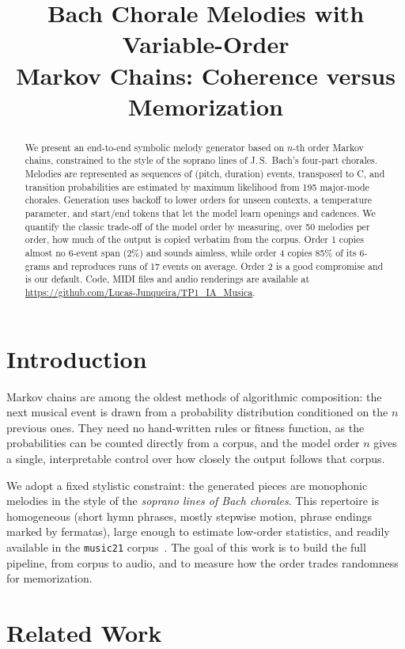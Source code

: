 \documentclass{article}
\title{Bach Chorale Melodies with Variable-Order\\ Markov Chains: Coherence versus Memorization}
\begin{document}
\maketitle

\begin{abstract}
We present an end-to-end symbolic melody generator based on $n$-th order Markov chains, constrained to the style of the soprano lines of J.\,S.~Bach's four-part chorales. Melodies are represented as sequences of (pitch, duration) events, transposed to C, and transition probabilities are estimated by maximum likelihood from 195 major-mode chorales. Generation uses backoff to lower orders for unseen contexts, a temperature parameter, and start/end tokens that let the model learn openings and cadences. We quantify the classic trade-off of the model order by measuring, over 50 melodies per order, how much of the output is copied verbatim from the corpus. Order 1 copies almost no 6-event span (2\%) and sounds aimless, while order 4 copies 85\% of its 6-grams and reproduces runs of 17 events on average. Order 2 is a good compromise and is our default. Code, MIDI files and audio renderings are available at \url{https://github.com/Lucas-Junqueira/TP1_IA_Musica}.
\end{abstract}

\section{Introduction}\label{sec:introduction}

Markov chains are among the oldest methods of algorithmic composition: the next musical event is drawn from a probability distribution conditioned on the $n$ previous ones. They need no hand-written rules or fitness function, as the probabilities can be counted directly from a corpus, and the model order $n$ gives a single, interpretable control over how closely the output follows that corpus.

We adopt a fixed stylistic constraint: the generated pieces are monophonic melodies in the style of the \emph{soprano lines of Bach chorales}. This repertoire is homogeneous (short hymn phrases, mostly stepwise motion, phrase endings marked by fermatas), large enough to estimate low-order statistics, and readily available in the \texttt{music21} corpus~\cite{cuthbert2010}. The goal of this work is to build the full pipeline, from corpus to audio, and to measure how the order trades randomness for memorization.

\section{Related Work}\label{sec:related}
\end{document}
